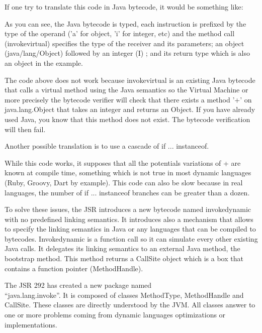 \documentclass{sig-alternate}
\def \Jsr{JSR\xspace}
\def \JSR{\Jsr 292\xspace}
\def \JVM{JVM\xspace}
\begin{document}
      If one try to translate this code in Java bytecode, it would be something like:

      

      As you can see, the Java bytecode is typed, each instruction is prefixed 
      by the type of the operand ('a' for object, 'i' for integer, etc)
      and the method call (invokevirtual) specifies the type of the receiver and its parameters;
      an object (java/lang/Object) followed by an integer (I) ; and its return type
      which is also an object in the example.

      The code above does not work because invokevirtual is an existing Java bytecode that calls
      a virtual method using the Java semantics so the Virtual Machine or more precisely
      the bytecode verifier will check that there exists a method '+' on java.lang.Object
      that takes an integer and returns an Object. If you have already used Java, you know
      that this method does not exist. The bytecode verification will then fail.

      Another possible translation is to use a cascade of if ... instanceof.

      

      While this code works, it supposes that all the potentials variations of + are known at compile time,
      something which is not true in most dynamic languages (Ruby, Groovy, Dart by example).
      This code can also be slow because in real languages, the number of if ... instanceof branches
      can be greater than a dozen. 

      To solve these issues, the \Jsr introduces a new bytecode named invokedynamic with no predefined
      linking semantics. It introduces also a mechanism that allows to specify the linking semantics in Java
      or any languages that can be compiled to bytecodes.
      Invokedynamic is a function call so it can simulate every other existing Java calls.
      It delegates its linking semantics to an external Java method, the bootstrap method.
      This method returns a CallSite object which is a box that contains a function pointer (MethodHandle).

      The \JSR has created a new package named\\ ``java.lang.invoke''.
      It is composed of classes MethodType, MethodHandle and CallSite.
      These classes are directly understood by the \JVM.
      All classes answer to one or more problems coming from dynamic languages optimizations or implementations.
\end{document}

